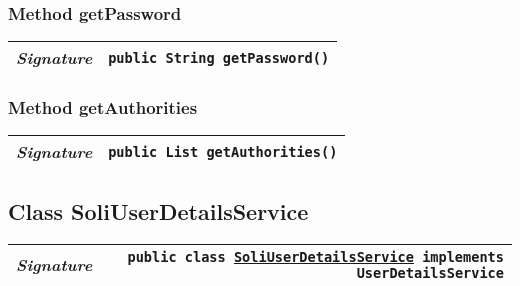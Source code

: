 \begin{adjustwidth}{1.5em}{0pt}
\begin{adjustwidth}{1.5em}{0pt}
\begin{adjustwidth}{1.5em}{0pt}
{\begin{tabularx}{1.0\linewidth}{@{}l R@{}}
      \end{tabularx}}
    \end{adjustwidth}\subsubsection{Method getPassword\label{edu.kit.hci.soli.config.security.SoliUserDetails@getPassword()}}
    \begin{adjustwidth}{1.5em}{0pt}
      {\begin{tabularx}{1.0\linewidth}{@{}l R@{}}
        \emph{Signature} & \texttt{public \texttt{String} getPassword()} \\
        \hline
  
      \end{tabularx}}
    \end{adjustwidth}\subsubsection{Method getAuthorities\label{edu.kit.hci.soli.config.security.SoliUserDetails@getAuthorities()}}
    \begin{adjustwidth}{1.5em}{0pt}
      {\begin{tabularx}{1.0\linewidth}{@{}l R@{}}
        \emph{Signature} & \texttt{public \texttt{List} getAuthorities()} \\
        \hline
  
      \end{tabularx}}
    \end{adjustwidth}
  \end{adjustwidth}\subsection{Class SoliUserDetailsService\label{edu.kit.hci.soli.config.security.SoliUserDetailsService} }
  \begin{adjustwidth}{1.5em}{0pt}
    {\begin{tabularx}{1.0\linewidth}{@{}l R@{}}
      \emph{Signature} & \texttt{public  class \texttt{\hyperref[edu.kit.hci.soli.config.security.SoliUserDetailsService]{\texttt{SoliUserDetailsService}} implements \texttt{UserDetailsService}}} \\
      \hline
  

\end{tabularx}}
\end{adjustwidth}
\end{adjustwidth}
